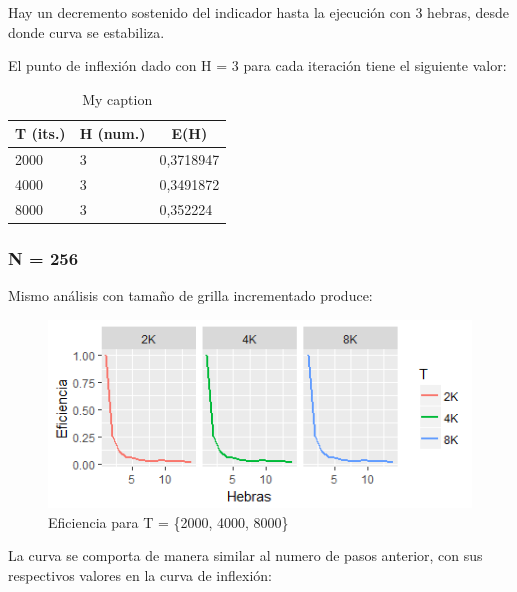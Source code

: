 \documentclass[jou]{apa6}
\begin{document}
Hay un decremento sostenido del indicador hasta la ejecución con 3 hebras, desde donde curva se estabiliza.

El punto de inflexión dado con H = 3 para cada iteración tiene el siguiente valor:

\begin{table}[]
\centering
\caption{My caption}
\label{my-label}
\begin{tabular}{@{}lll@{}}
\toprule
\multicolumn{1}{c}{T (its.)} & \multicolumn{1}{c}{H (num.)} & \multicolumn{1}{c}{E(H)} \\ \midrule
2000                         & 3                            & 0,3718947                \\
4000                         & 3                            & 0,3491872                \\
8000                         & 3                            & 0,352224                 \\ \bottomrule
\end{tabular}
\end{table}

\subsubsection{N = 256}
Mismo análisis con tamaño de grilla incrementado produce:

\begin{figure}[h]
	\includegraphics[width=\columnwidth]{efic-256px.png}
	\caption{Eficiencia para T = \{2000, 4000, 8000\}}
	\label{fig:Figure6}
\end{figure}

La curva se comporta de manera similar al numero de pasos anterior, con sus respectivos valores en la curva de inflexión:
\end{document}
